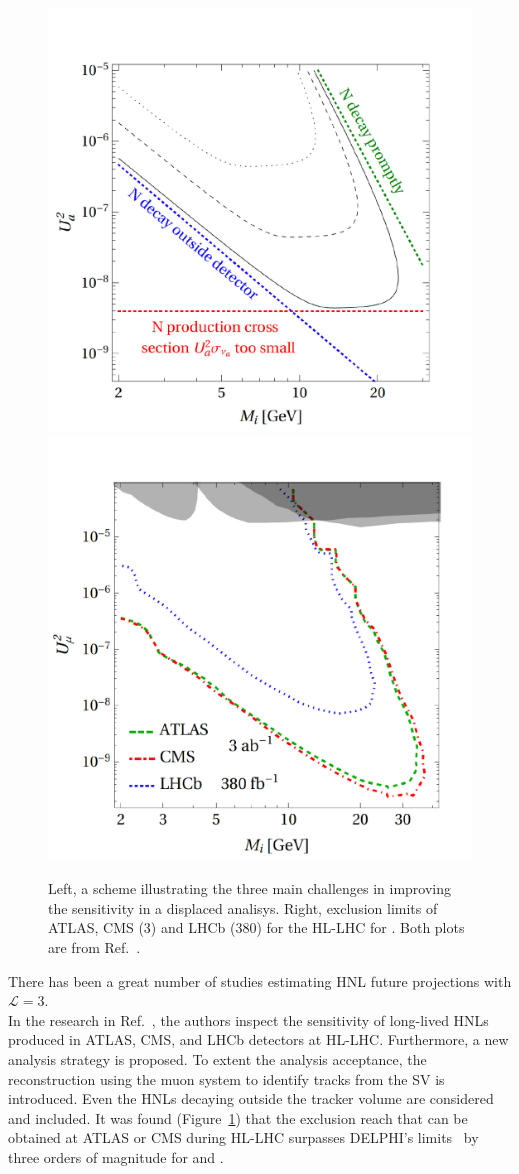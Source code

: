 \begin{figure}[h!]
\centering
    \includegraphics[clip,trim=0.cm 0cm 0cm 2cm, width=.48\textwidth]{Figures/c7/marco_god.pdf}
    \includegraphics[clip,trim=0.cm 0cm 0cm 2cm, width=.47\textwidth]{Figures/c7/marco_mu_HL.pdf}
\caption{Left, a scheme illustrating the three main challenges in
  improving the sensitivity in a displaced analisys. Right, exclusion
  limits of ATLAS, CMS (3\abinv) and LHCb (380\fbinv)
 for the HL-LHC for \mixparm. Both plots are
  from Ref.~\cite{Drewes_2020_jan}. }
\label{fig:marco_sketch_ll}
\end{figure}

There has been a great number of studies estimating HNL future
projections with $\mathcal{L} = 3$\abinv.\\
In the research in Ref.~\cite{Drewes_2020_jan}, the authors inspect the
sensitivity of long-lived HNLs produced in ATLAS, CMS, and LHCb
detectors at HL-LHC. Furthermore, a new analysis strategy is proposed. To extent
the analysis acceptance, the reconstruction using the muon system to identify tracks from the
SV is introduced. Even the HNLs decaying outside the tracker
volume are considered and included. It was found
(Figure~\ref{fig:marco_sketch_ll}) that the exclusion
reach that can be obtained at ATLAS or CMS during HL-LHC surpasses
DELPHI's limits~\cite{Abreu:1996pa} by three orders of magnitude for
\mixparm and \mixpare.\\


